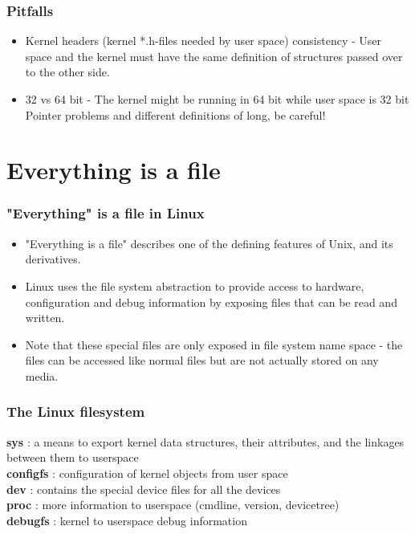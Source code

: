 \documentclass{beamer}
\begin{document}
\begin{frame}
\frametitle{Pitfalls}
\begin{itemize}
	\item Kernel headers (kernel *.h-files needed by user space) consistency - User space and the kernel must have the same definition of structures passed over to the other side.
	\item 32 vs 64 bit - The kernel might be running in 64 bit while user space is 32 bit
Pointer problems and different definitions of long, be careful!
\end{itemize}
\end{frame}

\section{Everything is a file}

\begin{frame}
\frametitle{"Everything" is a file in Linux}
\begin{itemize}
	\item "Everything is a file" describes one of the defining features of Unix, and its derivatives.

	\item Linux uses the file system abstraction to provide access to hardware, configuration and debug information by exposing files that can be read and written.
	\item Note that these special files are only exposed in file system name space - the files can be accessed like normal files but are not actually stored on any media.
\end{itemize}
\end{frame}

\begin{frame}
\frametitle{The Linux filesystem}
\textbf{sys}  : a means to export kernel data structures, their attributes, and the 
linkages between them to userspace \\
\textbf{configfs} : configuration of kernel objects from user space \\
\textbf{dev} : contains the special device files for all the devices \\
\textbf{proc} : more information to userspace (cmdline, version, devicetree) \\
\textbf{debugfs} : kernel to userspace debug information \\
\end{frame}
\end{document}

